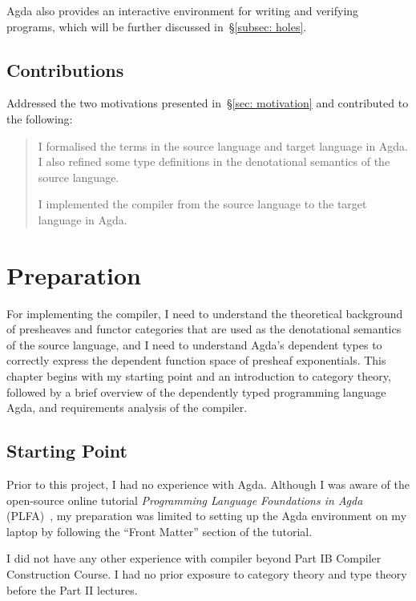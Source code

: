 \documentclass[12pt,a4paper]{report}
\theoremstyle{definition}
\newcounter{motivation}
\newcommand{\secref}[1]{\S\ref{#1}}
\begin{document}
        Agda also provides an interactive environment for writing and verifying programs, which will be further discussed in~\secref{subsec: holes}.

    \section{Contributions}
        Addressed the two motivations presented in~\secref{sec: motivation} and contributed to the following:
        \begin{quote}            
            \savedmotivationI
            I formalised the terms in the source language and target language in Agda. I also refined some type definitions in the denotational semantics of the source language.
            
            \savedmotivationII
            I implemented the compiler from the source language to the target language in Agda. 
        \end{quote}


\chapter{Preparation}
    \minitoc

    For implementing the compiler, I need to understand the theoretical background of presheaves and functor categories that are used as the denotational semantics of the source language, and I need to understand Agda's dependent types to correctly express the dependent function space of presheaf exponentials. This chapter begins with my starting point and an introduction to category theory, followed by a brief overview of the dependently typed programming language Agda, and requirements analysis of the compiler.

    \section{Starting Point}
    Prior to this project, I had no experience with Agda. Although I was aware of the open-source online tutorial \textit{Programming Language Foundations in Agda} (PLFA)~\autocite{plfa}, my preparation was limited to setting up the Agda environment on my laptop by following the ``Front Matter'' section of the tutorial.

    I did not have any other experience with compiler beyond Part IB Compiler Construction Course. I had no prior exposure to category theory and type theory before the Part II lectures.
\end{document}
